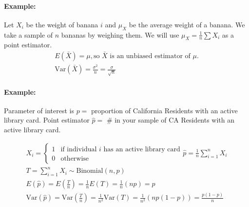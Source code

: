 \paragraph*{Example:}
Let $X_i$ be the weight of banana $i$ and $\mu_X$ be the average weight of a banana. We take a sample of $n$ bananas by weighing them.
We will use $\mu_X = \frac{1}{n} \sum X_i$ as a point estimator.
\begin{align*}
    E(\bar{X}) = \mu, \text{so } \bar{X} \text{ is an unbiased estimator of } \mu. \\
    \text{Var}(\bar{X}) = \frac{\sigma^2}{n} = \frac{\sigma}{\sqrt{n}}
\end{align*}

\paragraph*{Example:}
Parameter of interest is $p =$ proportion of California Residents with an active library card. Point estimator $\hat{p} =$ \# in your sample of CA Residents
with an active library card.

\begin{align*}
    X_i = \begin{cases}
        1 & \text{if individual } i \text{ has an active library card} \\
        0 & \text{otherwise}
    \end{cases}
    \hat{p} = \frac{1}{n} \sum_{i=1}^n X_i\\
    T = \sum_{i=1}^n X_i \sim \text{Binomial}(n, p)\\
    E(\hat{p}) = E\left(\frac{T}{n}\right) = \frac{1}{n} E(T) = \frac{1}{n} (n p) = p \\
    \text{Var}(\hat{p}) = \text{Var}\left(\frac{T}{n}\right) = \frac{1}{n^2} \text{Var}(T) = \frac{1}{n^2} (n p (1 - p)) = \frac{p(1 - p)}{n}
\end{align*}

